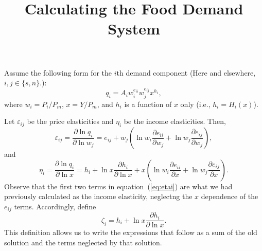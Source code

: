 \documentclass[11pt]{article}
\title{Calculating the Food Demand System}
\begin{document}
\maketitle

Assume the following form for the $i$th demand component (Here and
elsewhere, $i,j \in \lbrace s,n\rbrace$.):
\begin{equation}
  q_i = A_i w_i^{e_{ii}} w_j^{e_{ij}} x^{h_i},
\end{equation}
where $w_i = P_i/P_m$, $x = Y/P_m$, and $h_i$ is a function of $x$
only (i.e., $h_i = H_i(x)$).

Let $\varepsilon_{ij}$ be the price elasticities and $\eta_i$ be the
income elasticities.  Then,
\begin{equation}
  \label{eq:epsij}
  \varepsilon_{ij} = \frac{\partial \ln q_i}{\partial \ln w_j} =
  e_{ij} + w_j\left(\ln w_i \frac{\partial e_{ii}}{\partial w_j} + \ln
  w_j \frac{\partial e_{ij}}{\partial w_j}\right),
\end{equation}
and
\begin{equation}
  \label{eq:etai}
  \eta_i = \frac{\partial \ln q_i}{\partial \ln x} = h_i + \ln x
  \frac{\partial h_i}{\partial \ln x} + x\left(\ln w_i  \frac{\partial
    e_{ii}}{\partial x} + \ln w_j \frac{\partial e_{ij}}{\partial
    x}\right).
\end{equation}
Observe that the first two terms in equation~(\ref{eq:etai}) are what
we had previously calculated as the income elasticity, neglectng the
$x$ dependence of the $e_{ij}$ terms.  Accordingly, define
\begin{equation}
  \zeta_i = h_i + \ln x \frac{\partial h_i}{\partial \ln x}.
\end{equation}
This definition allows us to write the expressions that follow as a
sum of the old solution and the terms neglected by that solution.
\end{document}
